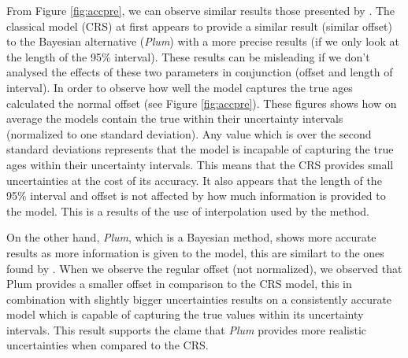 \documentclass [10pt] {article}
\begin{document}
From Figure \ref{fig:accpre}, we can observe similar results those presented by \cite{Blaauw2018}. The classical model (CRS) at first appears to provide a similar result (similar offset) to the Bayesian alternative (\textit{Plum}) with a more precise results (if we only look at the length of the 95\% interval). 
These results can be misleading if we don't analysed the effects of these two parameters in conjunction (offset and length of interval). In order to observe how well the model captures the true ages calculated the normal offset (see Figure \ref{fig:accpre}). 
These figures shows how on average the models contain the true within their uncertainty intervals (normalized to one standard deviation). Any value which is over the second standard deviations represents that the model is incapable of capturing the true ages within their uncertainty intervals.  
This means that the CRS provides small uncertainties at the cost of its accuracy.
It also appears that the length of the 95\% interval and offset is not affected by how much information is provided to the model. This is a results of the use of interpolation used by the method. 

On the other hand, \textit{Plum}, which is a Bayesian method, shows more accurate results as more information is given to the model, this are similart to the ones found by \citet{Blaauw2018}. 
When we observe the regular offset (not normalized), we observed that Plum provides a smaller offset in comparison to the CRS model, this in combination with slightly bigger uncertainties results on a consistently accurate model which is capable of capturing the true values within its uncertainty intervals. 
This result supports the clame that \textit{Plum} provides more realistic uncertainties when compared to the CRS. 
\end{document}
